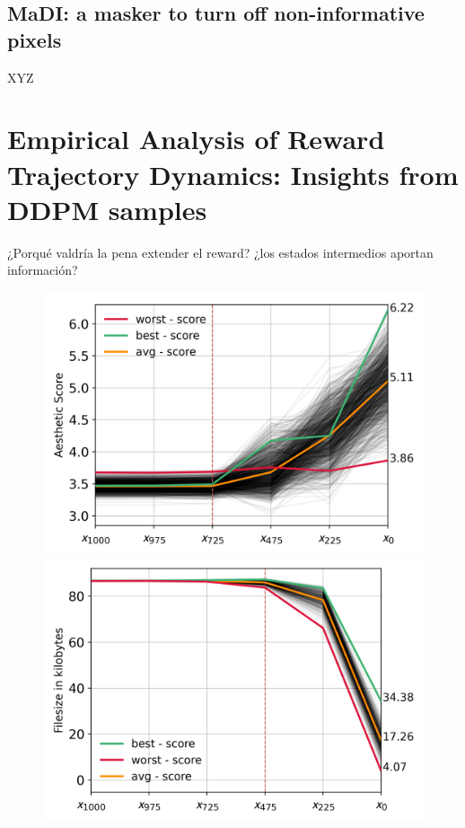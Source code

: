 \subsection{MaDI: a masker to turn off non-informative pixels}

XYZ

\section{Empirical Analysis of Reward Trajectory Dynamics: Insights from DDPM samples}

¿Porqué valdría la pena extender el reward? ¿los estados intermedios 
aportan información?

\begin{figure}[ht]
  \centering
  \begin{minipage}{0.5\textwidth}
      \centering
      \includegraphics[width=1\textwidth]{img/results/1k-trajectories-aestheic-score-single.png} %
  \end{minipage}\hfill
  \begin{minipage}{0.5\textwidth}
      \centering
      \includegraphics[width=1\textwidth]{img/results/1k-trajectories-jpeg-size-single.png} %

\end{minipage}
\end{figure}
